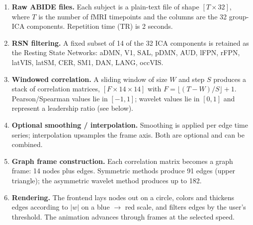 \documentclass[11pt,a4paper]{article}
\begin{document}
\begin{enumerate}
    \item \textbf{Raw ABIDE files.} Each subject is a plain-text file
    of shape $[T \times 32]$, where $T$ is the number of fMRI timepoints
    and the columns are the 32 group-ICA components. Repetition time
    (TR) is 2 seconds.

    \item \textbf{RSN filtering.} A fixed subset of 14 of the 32 ICA
    components is retained as the Resting State Networks:
    aDMN, V1, SAL, pDMN, AUD, lFPN, rFPN, latVIS, latSM, CER, SM1, DAN,
    LANG, occVIS.

    \item \textbf{Windowed correlation.} A sliding window of size $W$
    and step $S$ produces a stack of correlation matrices,
    $[F \times 14 \times 14]$ with $F = \lfloor(T-W)/S\rfloor + 1$.
    Pearson/Spearman values lie in $[-1, 1]$; wavelet values lie in
    $[0, 1]$ and represent a leadership ratio (see below).

    \item \textbf{Optional smoothing / interpolation.} Smoothing is
    applied per edge time series; interpolation upsamples the frame
    axis. Both are optional and can be combined.

    \item \textbf{Graph frame construction.} Each correlation matrix
    becomes a graph frame: 14 nodes plus edges. Symmetric methods
    produce 91 edges (upper triangle); the asymmetric wavelet method
    produces up to 182.

    \item \textbf{Rendering.} The frontend lays nodes out on a circle,
    colors and thickens edges according to $|w|$ on a blue $\rightarrow$
    red scale, and filters edges by the user's threshold. The animation
    advances through frames at the selected speed.
\end{enumerate}
\end{document}
